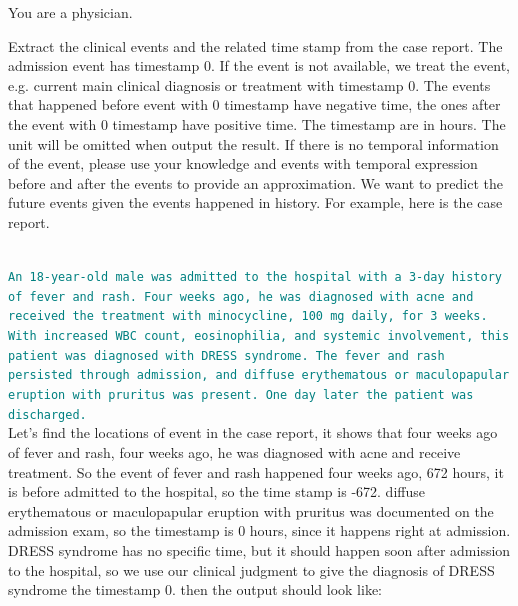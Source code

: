\begin{minipage}{0.99\textwidth}
\begin{tcolorbox}[colback=gray!5, colframe=gray!100, title=Prompt, boxrule=2pt]

{You are a physician. 

Extract the clinical events and the related time stamp from the case report. The admission event has timestamp 0. If the event is not available, we treat the event, e.g. current main clinical diagnosis or treatment with timestamp 0. The events that happened before event with 0 timestamp have negative time, the ones after the event with 0 timestamp have positive time. The timestamp are in hours. The unit will be omitted when output the result. If there is no temporal information of the event, please use your knowledge and events with temporal expression before and after the events to provide an approximation. We want to predict the future events given the events happened in history. For example, here is the case report.}\\

\noindent
\textcolor{teal}{\texttt{An 18-year-old male was admitted to the hospital with a 3-day history of fever and rash. Four weeks ago, he was diagnosed with acne and received the treatment with minocycline, 100 mg daily, for 3 weeks. With increased WBC count, eosinophilia, and systemic involvement, this patient was diagnosed with DRESS syndrome. The fever and rash persisted through admission, and diffuse erythematous or maculopapular eruption with pruritus was present. One day later the patient was discharged.}}\\

\noindent
{Let's find the locations of event in the case report, it shows that four weeks ago of fever and rash, four weeks ago, he was diagnosed with acne and receive treatment. So the event of fever and rash happened four weeks ago, 672 hours, it is before admitted to the hospital, so the time stamp is -672. diffuse erythematous or maculopapular eruption with pruritus was documented on the admission exam, so the timestamp is 0 hours, since it happens right at admission. DRESS syndrome has no specific time, but it should happen soon after admission to the hospital, so we use our clinical judgment to give the diagnosis of DRESS syndrome the timestamp 0. then the output should look like:}\\
\vspace{2mm}
\noindent 


\end{tcolorbox}
\end{minipage}

